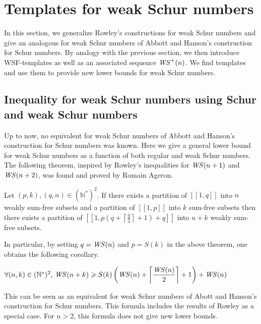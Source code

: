 \section{Templates for weak Schur numbers}
\label{WeakSchur}

\qquad In this section, we generalize Rowley's constructions for weak Schur numbers \cite{RowleyWS} and give an analogous
for weak Schur numbers of Abbott and Hanson's construction for Schur numbers. By analogy with the previous section,
we then introduce WSF-templates as well as an associated sequence \(\mathit{WS}^+(n)\). We find templates and use them to
provide new lower bounds for weak Schur numbers.

\subsection{Inequality for weak Schur numbers using Schur and weak Schur numbers}

\qquad Up to now, no equivalent for weak Schur numbers of Abbott and Hanson's construction for Schur numbers
\cite{AbbottHanson} was known. Here we give a general lower bound for weak Schur numbers as a function of both 
regular and weak Schur numbers. The following theorem, inspired by Rowley's inequalities for \(\mathit{WS} (n+1)\) and 
\(\mathit{WS} (n+2)\), was found and proved by Romain Ageron.

\begin{theorem}
\label{theorem}
\begin{sloppypar}
Let \((p,k), (q,n) \in (\mathbb{N}^*)^2\). If there exists a partition of \([\![1,q]\!]\) into \(n\) weakly sum-free
subsets and a partition of \([\![1,p]\!]\) into \(k\) sum-free
subsets then there exists a partition of \({[\![1,p(q+\left \lceil \frac{q}{2} \right \rceil + 1)+q]\!]}\) into \(n+k\)
weakly sum-free subsets.
\end{sloppypar}
\end{theorem}

In particular, by setting \(q = \mathit{WS} (n)\) and \(p = S(k)\) in the above theorem, one obtains the following corollary.

\begin{corollary}
\( \forall (n,k) \in (\mathbb{N}^*)^2 \text{, } \mathit{WS} (n+k) \geqslant S(k) \left (\mathit{WS} (n) + \left \lceil \displaystyle \frac{\mathit{WS} (n)}{2}
\right \rceil +1 \right) + \mathit{WS} (n)\)
\end{corollary}

This can be seen as an equivalent for weak Schur numbers of Abott and Hanson's construction for Schur numbers. This formula includes
the results of Rowley \cite{RowleyWS} as a special case. For \(n>2\), this formula does not give new lower bounds.

